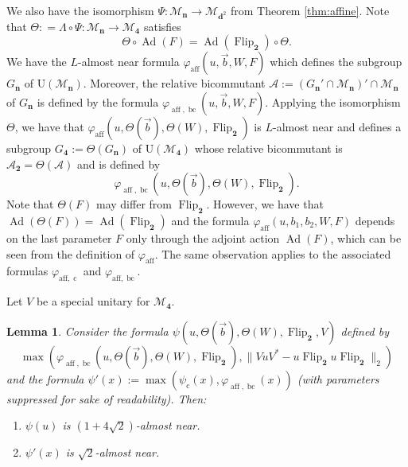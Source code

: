 \documentclass[12pt]{amsart}
\numberwithin{equation}{section}
\newtheorem{lem}[thm]{Lemma}
\theoremstyle{definition}
\def\M{\mathcal{M}}
\def \M{\mathcal{M}}
\def \A{\mathcal{A}}
\begin{document}
We also have the isomorphism $\Psi:\M_{\mathbf{n}}\to \M_{\mathbf{d}^2}$ from Theorem \ref{thm:affine}. Note that $\Theta\colon=\Lambda\circ \Psi\colon \M_{\mathbf{n}}\to \M_{\mathbf{4}}$ satisfies  $$\Theta\circ \operatorname{Ad}(F)=\operatorname{Ad}(\operatorname{Flip}_{\mathbf{2}})\circ \Theta.$$ We have the $L$-almost near formula $\varphi_{\operatorname{aff}}(u,\vec b,W,F)$ which defines the subgroup $G_\mathbf{n}$ of $\mathrm{U}(\M_\mathbf{n})$.  Moreover, the relative bicommutant $\A:=(G_\mathbf{n}'\cap \M_{\mathbf{n}})'\cap \M_{\mathbf{n}}$ of $G_\mathbf{n}$ is defined by the formula $\varphi_{\operatorname{aff},\operatorname{bc}}(u,\vec b,W,F)$.  Applying the isomorphism $\Theta$, we have that $\varphi_{\operatorname{aff}}(u,\Theta(\vec b),\Theta(W),\operatorname{Flip}_{\mathbf{2}})$ is $L$-almost near and defines a subgroup $G_{\mathbf{4}}:=\Theta(G_{\mathbf{n}})$ of $\mathrm{U}(\M_\mathbf{4})$ whose relative bicommutant is $\A_{\mathbf{2}}=\Theta(\mathcal{A})$ and is defined by $$\varphi_{\operatorname{aff},\operatorname{bc}}(u,\Theta(\vec b),\Theta(W),\operatorname{Flip}_{\mathbf{2}}).$$  
Note that $\Theta(F)$ may differ from $\operatorname{Flip}_{\mathbf{2}}$. However, we have that $\operatorname{Ad}(\Theta(F))=\operatorname{Ad}(\operatorname{Flip}_{\mathbf{2}})$ and the formula $\varphi_{\operatorname{aff}}(u,b_1,b_2,W,F)$ depends on the last parameter $F$ only through the adjoint action $\operatorname{Ad}(F)$, which can be seen from the definition of $\varphi_{\operatorname{aff}}$. The same observation applies to the associated
formulas $\varphi_{\mathrm{aff},\operatorname{c}}$ and
$\varphi_{\mathrm{aff},\operatorname{bc}}$.

Let $V$ be a special unitary for $\M_{\mathbf{4}}$.

\begin{lem}
Consider the formula $\psi(u,\Theta(\vec b),\Theta(W),\operatorname{Flip}_{\mathbf{2}},V)$ defined by $$\max(\varphi_{\operatorname{aff},\operatorname{bc}}(u,\Theta(\vec b),\Theta(W),\operatorname{Flip}_{\mathbf{2}}),\|VuV^*-u\operatorname{Flip}_{\mathbf{2}}u\operatorname{Flip}_{\mathbf{2}}\|_2)$$ and the formula $\psi'(x):=\max(\psi_{\operatorname{c}}(x),\varphi_{\operatorname{aff},\operatorname{bc}}(x))$ (with parameters suppressed for sake of readability).  Then:
\begin{enumerate}
    \item $\psi(u)$ is $(1+4\sqrt{2})$-almost near.
    \item $\psi'(x)$ is $\sqrt{2}$-almost near. 
\end{enumerate}
\end{lem}
\end{document}
